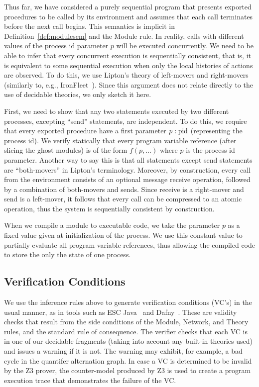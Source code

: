 Thus far, we have considered a purely sequential program that presents
exported procedures to be called by its environment and assumes that
each call terminates before the next call begins.  This semantics is
implicit in Definition~\ref{def:modulesem} and the Module rule. In
reality, calls with different values of the process id parameter $p$
will be executed concurrently. We need to be able to infer that every
concurrent execution is sequentially consistent, that is, it is
equivalent to some sequential execution when only the local histories
of actions are observed. To do this, we use Lipton's theory of
left-movers and right-movers~\cite{Lipton}
(similarly to, e.g., IronFleet~\cite{IronFleet}).
Since this argument does not relate directly to the use of decidable theories, we only
sketch it here.

First, we need to show that any two statements executed by two
different processes, excepting ``send'' statements, are independent.
To do this, we require that every exported procedure have a first
parameter $p:\mbox{pid}$ (representing the process id). We verify statically
that every program variable reference (after slicing the ghost
modules) is of the form $f(p,\ldots)$ where $p$ is the process id
parameter. Another way to say this is that all statements except send
statements are ``both-movers'' in Lipton's terminology. Moreover, by
construction, every call from the environment consists of an optional
message receive operation, followed by a combination of both-movers
and sends. Since receive is a right-mover and send is a left-mover, it
follows that every call can be compressed to an atomic operation, thus
the system is sequentially consistent by construction.

When we compile a module to executable code, we take the parameter $p$
as a fixed value given at initialization of the process. We use this
constant value to partially evaluate all program variable references,
thus allowing the compiled code to store the only the state of one
process.

\subsection{Verification Conditions}

We use the inference rules above to generate verification conditions
(VC's) in the usual manner, as in tools such as ESC Java~\cite{ESC}
and Dafny~\cite{Dafny}. These are validity checks that result from the
side conditions of the Module, Network, and Theory rules, and the
standard rule of consequence. The verifier checks that each VC is in
one of our decidable fragments (taking into account any built-in
theories used) and issues a warning if it is not. The warning may
exhibit, for example, a bad cycle in the quantifer alternation
graph. In case a VC is determined to be invalid by the Z3 prover, the
counter-model produced by Z3 is used to create a program execution
trace that demonstrates the failure of the VC.

%
%
%
